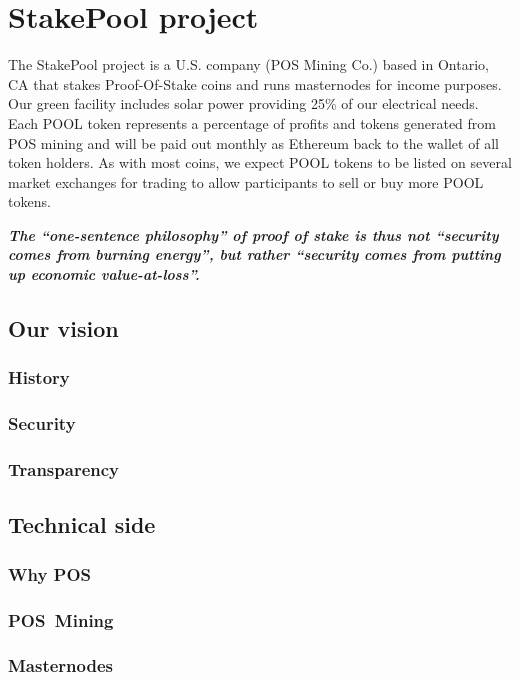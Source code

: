 \section{StakePool project}

The  StakePool  project  is  a   U.S.  company  (POS  Mining  Co.) based  in  Ontario,  CA  that  stakes  Proof-Of-Stake  coins  and  runs  masternodes  for income  purposes.  Our  green  facility  includes  solar  power  providing  25\%  of  our  electrical needs.  Each  POOL  token  represents  a   percentage  of  profits  and  tokens  generated  from POS  mining  and  will  be  paid  out  monthly  as  Ethereum  back  to  the  wallet  of  all  token holders.  As  with  most  coins,  we  expect  POOL  tokens  to  be  listed  on  several  market exchanges  for  trading  to  allow  participants  to  sell  or  buy  more  POOL  tokens.

\textbf{\emph{The ``one-sentence philosophy'' of proof of stake is thus not ``security comes from burning energy'', but rather ``security comes from putting up economic value-at-loss''.}}  \cite{vbuterinposphi}

 \subsection{Our vision}
  \subsubsection{History}
  \subsubsection{Security}
  \subsubsection{Transparency}

 \subsection{Technical side}
  \subsubsection{Why POS}
  \subsubsection{POS Mining}
  \subsubsection{Masternodes}

